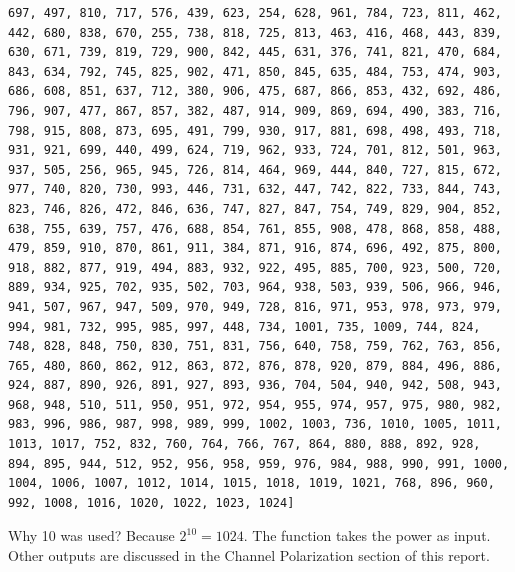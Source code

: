 \documentclass{report}
\begin{document}
\begin{lstlisting}
697, 497, 810, 717, 576, 439, 623, 254, 628, 961, 784, 723, 811, 462, 442, 680, 838, 670, 255, 738, 818, 725, 813, 463, 416, 468, 443, 839, 630, 671, 739, 819, 729, 900, 842, 445, 631, 376, 741, 821, 470, 684, 843, 634, 792, 745, 825, 902, 471, 850, 845, 635, 484, 753, 474, 903, 686, 608, 851, 637, 712, 380, 906, 475, 687, 866, 853, 432, 692, 486, 796, 907, 477, 867, 857, 382, 487, 914, 909, 869, 694, 490, 383, 716, 798, 915, 808, 873, 695, 491, 799, 930, 917, 881, 698, 498, 493, 718, 931, 921, 699, 440, 499, 624, 719, 962, 933, 724, 701, 812, 501, 963, 937, 505, 256, 965, 945, 726, 814, 464, 969, 444, 840, 727, 815, 672, 977, 740, 820, 730, 993, 446, 731, 632, 447, 742, 822, 733, 844, 743, 823, 746, 826, 472, 846, 636, 747, 827, 847, 754, 749, 829, 904, 852, 638, 755, 639, 757, 476, 688, 854, 761, 855, 908, 478, 868, 858, 488, 479, 859, 910, 870, 861, 911, 384, 871, 916, 874, 696, 492, 875, 800, 918, 882, 877, 919, 494, 883, 932, 922, 495, 885, 700, 923, 500, 720, 889, 934, 925, 702, 935, 502, 703, 964, 938, 503, 939, 506, 966, 946, 941, 507, 967, 947, 509, 970, 949, 728, 816, 971, 953, 978, 973, 979, 994, 981, 732, 995, 985, 997, 448, 734, 1001, 735, 1009, 744, 824, 748, 828, 848, 750, 830, 751, 831, 756, 640, 758, 759, 762, 763, 856, 765, 480, 860, 862, 912, 863, 872, 876, 878, 920, 879, 884, 496, 886, 924, 887, 890, 926, 891, 927, 893, 936, 704, 504, 940, 942, 508, 943, 968, 948, 510, 511, 950, 951, 972, 954, 955, 974, 957, 975, 980, 982, 983, 996, 986, 987, 998, 989, 999, 1002, 1003, 736, 1010, 1005, 1011, 1013, 1017, 752, 832, 760, 764, 766, 767, 864, 880, 888, 892, 928, 894, 895, 944, 512, 952, 956, 958, 959, 976, 984, 988, 990, 991, 1000, 1004, 1006, 1007, 1012, 1014, 1015, 1018, 1019, 1021, 768, 896, 960, 992, 1008, 1016, 1020, 1022, 1023, 1024]
\end{lstlisting}
Why 10 was used? Because $2^{10} = 1024$. The function takes the power as input. Other outputs are discussed in the Channel Polarization section of this report.
\end{document}
